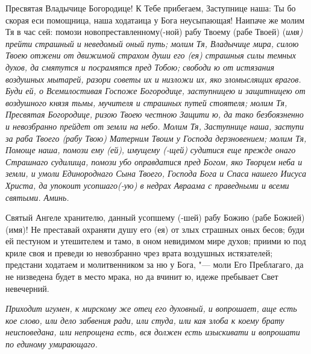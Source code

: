 \mychapterending




Пресвятая Владычице Богородице! К Тебе прибегаем, Заступнице наша: Ты бо скорая еси помощница, наша ходатаица у Бога неусыпающая! Наипаче же молим Тя в час сей: помози новопреставленному(-ной) рабу Твоему (рабе Твоей) (\itshape имя\normalfont{}) прейти страшный и неведомый оный путь; молим Тя, Владычице мира, силою Твоею отжени от движимой страхом души его (ея) страшныя силы темных духов, да смятутся и посрамятся пред Тобою; свободи ю от истязания воздушных мытарей, разори советы их и низложи их, яко зломыслящих врагов. Буди ей, о Всемилостивая Госпоже Богородице, заступницею и защитницею от воздушного князя тьмы, мучителя и страшных путей стоятеля; молим Тя, Пресвятая Богородице, ризою Твоею честною Защити ю, да тако безбоязненно и невозбранно прейдет от земли на небо. Молим Тя, Заступнице наша, заступи за раба Твоего (рабу Твою) Матерним Твоим у Господа дерзновением; молим Тя, Помоще наша, помози ему (ей), имущему (-щей) судитися еще прежде онаго Страшнаго судилища, помози убо оправдатися пред Богом, яко Творцем неба и земли, и умоли Единороднаго Сына Твоего, Господа Бога и Спаса нашего Иисуса Христа, да упокоит усопшаго(-ую) в недрах Авраама с праведными и всеми святыми. Аминь.


\mychapterending




Святый Ангеле хранителю, данный усопшему (-шей) рабу Божию (рабе Божией) (имя)! Не преставай охраняти душу его (ея) от злых страшных оных бесов; буди ей пестуном и утешителем и тамо, в оном невидимом мире духов; приими ю под криле своя и преведи ю невозбранно чрез врата воздушных истязателей; предстани ходатаем и молитвенником за ню у Бога, "--- моли Его Преблагаго, да не низведена будет в место мрака, но да вчинит ю, идеже пребывает Свет невечерний. 


\mychapterending


 

\itshape  Приходит игумен, к мирскому же отец его духовный, и вопрошает, аще есть
кое слово, или дело забвения ради, или студа, или кая злоба к коему брату
неисповедана, или непрощена есть, вся должен есть изыскивати и вопрошати
по единому умирающаго.\normalfont{}



